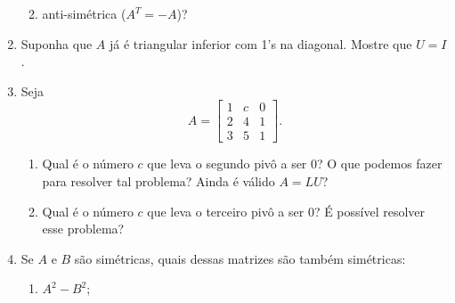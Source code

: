 \documentclass[leqno]{article}
\numberwithin{equation}{section}
\begin{document}
\begin{enumerate}
\begin{enumerate}
\begin{sol} 
\end{sol} 

\item anti-simétrica ($A^T = -A$)?

\begin{sol} 
\end{sol} 

\end{enumerate}

\item Suponha que $A$ já é triangular inferior com 1's na diagonal. Mostre que $U = I$.

\begin{sol} 
\end{sol} 

\item Seja 
$$A = \begin{bmatrix} 1 & c & 0  \\
2 & 4 & 1  \\
3 & 5 & 1 
\end{bmatrix}.$$

\begin{enumerate}

\item Qual é o número $c$ que leva o segundo pivô a ser 0? O que podemos fazer para resolver tal problema? Ainda é válido $A = LU$?

\begin{sol} 
\end{sol} 

\item Qual é o número $c$ que leva o terceiro pivô a ser 0? É possível resolver esse problema?

\begin{sol} 
\end{sol} 

\end{enumerate}

\item Se $A$ e $B$ são simétricas, quais dessas matrizes são também simétricas:

\begin{enumerate}

\item $A^2 - B^2$;

\begin{sol} 
\end{sol} 


\end{enumerate}
\end{enumerate}
\end{document}
